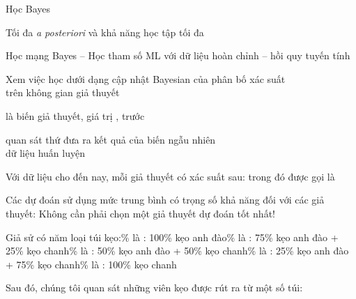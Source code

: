 \documentclass{article}
\begin{document}
\begin{huge}

\sf


\blob Học Bayes

\blob Tối đa {\em a posteriori} và khả năng học tập tối đa

\blob Học mạng Bayes\nl
-- Học tham số ML với dữ liệu hoàn chỉnh\nl
-- hồi quy tuyến tính



Xem việc học dưới dạng cập nhật Bayesian của phân bố xác suất\\
trên không gian giả thuyết 

 là biến giả thuyết, giá trị , trước 

quan sát thứ  đưa ra kết quả của biến ngẫu nhiên \\
dữ liệu huấn luyện 


Với dữ liệu cho đến nay, mỗi giả thuyết có xác suất sau:
\mat{\[
  P(h_i|\d) = \alpha P(\d|h_i) P(h_i)
\]}%
trong đó  được gọi là 

Các dự đoán sử dụng mức trung bình có trọng số khả năng đối với các giả thuyết:
\mat{\[
  \pv(X|\d) = \mysum_i\ \pv(X|\d,h_i) P(h_i|\d) = \mysum_i\ \pv(X|h_i) P(h_i|\d)
\]}%
Không cần phải chọn một giả thuyết dự đoán tốt nhất!



Giả sử có năm loại túi kẹo:\% là : 100\% kẹo anh đào\% là : 75\% kẹo anh đào + 25\% kẹo chanh\% là : 50\% kẹo anh đào + 50\% kẹo chanh\% là : 25\% kẹo anh đào + 75\% kẹo chanh\% là : 100\% kẹo chanh

\vspace*{0.2in}

\textwidth
{}

Sau đó, chúng tôi quan sát những viên kẹo được rút ra từ một số túi: \textwidth {}


\end{huge}
\end{document}
